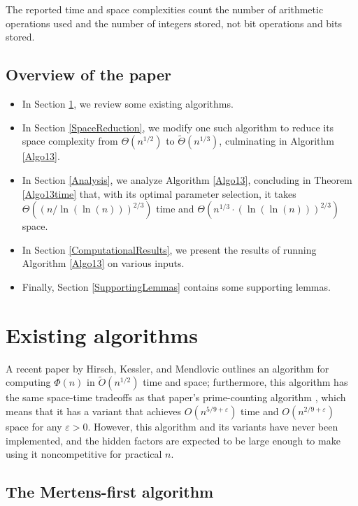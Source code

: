\documentclass[12pt]{article}
\newcommand{\softO}[0]{\widetilde{O}}
\newcommand{\softTheta}[0]{\widetilde{\Theta}}
\begin{document}
The reported time and space complexities count the number of arithmetic operations used and the number of integers stored, not bit operations and bits stored.

\subsection{Overview of the paper}

\begin{itemize}
\item In Section \ref{ExistingAlgorithms}, we review some existing algorithms.
\item In Section \ref{SpaceReduction}, we modify one such algorithm to reduce its space complexity from $\Theta(n^{1/2})$ to $\softTheta(n^{1/3})$, culminating in Algorithm \ref{Algo13}.
\item In Section \ref{Analysis}, we analyze Algorithm \ref{Algo13}, concluding in Theorem \ref{Algo13time} that, with its optimal parameter selection, it takes $\Theta\left( (n / \ln(\ln(n)))^{2/3} \right)$ time and $\Theta\left(n^{1/3} \cdot (\ln(\ln(n)))^{2/3} \right)$ space.
\item In Section \ref{ComputationalResults}, we present the results of running Algorithm \ref{Algo13} on various inputs.
\item Finally, Section \ref{SupportingLemmas} contains some supporting lemmas.
\end{itemize}

\section{Existing algorithms} \label{ExistingAlgorithms}

A recent paper by Hirsch, Kessler, and Mendlovic \cite[\S 5.6]{HKM2024} outlines an algorithm for computing $\Phi(n)$ in $\softO(n^{1/2})$ time and space; furthermore, this algorithm has the same space-time tradeoffs as that paper's prime-counting algorithm \cite{HKM2025}, which means that it has a variant that achieves $O(n^{5/9+\varepsilon})$ time and $O(n^{2/9+\varepsilon})$ space for any $\varepsilon>0$.  However, this algorithm and its variants have never been implemented, and the hidden factors are expected to be large enough to make using it noncompetitive for practical $n$.

\subsection{The Mertens-first algorithm}
\end{document}
